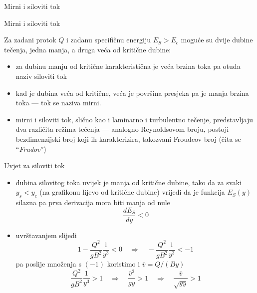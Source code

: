\documentclass[croatian]{beamer}
\begin{document}
\begin{frame}{Mirni i siloviti tok}

\begin{block}{Mirni i siloviti tok}

Za zadani protok $Q$ i zadanu specifičnu energiju $E_{S}>E_{c}$
moguće su dvije dubine tečenja, jedna manja, a druga veća od kritične
dubine:

\begin{itemize}
\item za dubinu manju od kritične karakteristična je veća brzina toka pa
otuda naziv \alert{siloviti tok}
\item kad je dubina veća od kritične, veća je površina presjeka pa je manja
brzina toka --- tok se naziva \alert{mirni}.
\end{itemize}
\end{block}
\begin{itemize}
\item mirni i siloviti tok, slično kao i laminarno i turbulentno tečenje,
predstavljaju dva različita režima tečenja --- analogno Reynoldsovom
broju, postoji bezdimenzijski broj koji ih karakterizira, takozvani
\alert{Froudeov broj} (čita se ``\emph{Frudov}'')
\end{itemize}
\end{frame}

\begin{frame}{Uvjet za siloviti tok}

\begin{itemize}
\item dubina silovitog toka uvijek je manja od kritične dubine, tako da
za svaki $y_{s}<y_{c}$ (na grafikonu lijevo od kritične dubine) vrijedi
da je funkcija $E_{S}(y)$ \alert{silazna} pa prva derivacija mora
biti manja od nule
\[
\frac{dE_{S}}{dy}<0
\]
\item uvrštavanjem slijedi
\[
1-\frac{Q^{2}}{gB^{2}}\frac{1}{y^{3}}<0\quad\Rightarrow\quad-\frac{Q^{2}}{gB^{2}}\frac{1}{y^{3}}<-1
\]
pa poslije množenja s $(-1)$ koristimo i $\bar{v}=Q/(By)$
\[
\frac{Q^{2}}{gB^{2}}\frac{1}{y^{3}}>1\quad\Rightarrow\quad\frac{\bar{v}^{2}}{gy}>1\quad\Rightarrow\quad\frac{\bar{v}}{\sqrt{gy}}>1
\]
\end{itemize}
\end{frame}
\end{document}
